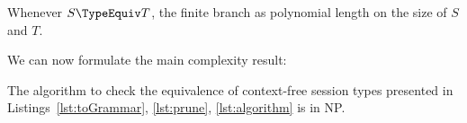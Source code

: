 \begin{theorem}
	Whenever $S\TypeEquiv T$, the finite branch as polynomial length 
	on the size of $S$ and $T$.
\end{theorem}

We can now formulate the main complexity result:

\begin{theorem}
	The algorithm to check the equivalence of context-free 
	session types presented in Listings~\ref{lst:toGrammar},
	\ref{lst:prune}, \ref{lst:algorithm}
	is in \textsf{NP}.
\end{theorem}


























